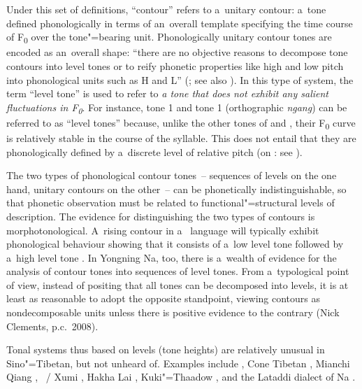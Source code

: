 Under this set of definitions, “{contour}” refers to a~unitary {contour}: a~tone defined phonologically
in terms of an~overall template specifying the time course of F\textsubscript{0} over the tone"=bearing
unit. Phonologically unitary {contour} tones are encoded as an~overall shape: “there are no objective
reasons to decompose  tone contours into level tones or to reify phonetic properties like
high and low pitch into phonological units such as H and L” (\citealt[94]{brunelle2009a}; see also
\citealt{brunelleetal2010,kirby2010}). In this type of system, the term “level tone” is used to
refer to \textit{a tone that does not exhibit any salient fluctuations in F\textsubscript{0}}. For instance,
 tone 1 and  tone 1 (orthographic \textit{ngang}) can be referred to as “level
tones” because, unlike the other tones of  and , their F\textsubscript{0} curve is relatively
stable in the course of the syllable. This does not entail that they are phonologically defined by
a~discrete level of relative pitch (on : see \citealt{xuetal2001}).

The two types of phonological contour tones~-- sequences of levels on the one hand, unitary contours
on the other~-- can be 
phonetically indistinguishable, so that phonetic observation must be related
to functional"=structural levels of description. The evidence for distinguishing the two types of
contours is morphotonological. A~rising {contour} in a~ language will typically exhibit
phonological behaviour showing that it consists of a~low level tone followed by a~high level tone
\citep{clementsetal1984,clementsetal2007}. In Yongning Na, too, there is a~wealth of evidence for the analysis of contour tones into sequences of level
tones. From a~typological point of view, instead of positing that all tones can be decomposed into
levels, it is at least as reasonable to adopt the opposite standpoint, viewing contours as
nondecomposable units unless there is positive evidence to the contrary (Nick Clements, p.c.\ 2008).


Tonal systems thus based on levels (tone heights) are relatively unusual in Sino"=Tibetan, but not
unheard of. Examples include  \citep{matisoff1997a,ding2006,jacques2011a,daudey2014}, Cone Tibetan \citep{sun2003b,jacques2014b}, Mianchi Qiang
\citep{evans2008a}, ~/ Xumi \citep{chirkovaetal2009}, Hakha Lai \citep{hymanetal2002a},
Kuki"=Thaadow \citep{hyman2010b}, and the Lataddi dialect of Na \citep{dobbsetal2016}. 
 
